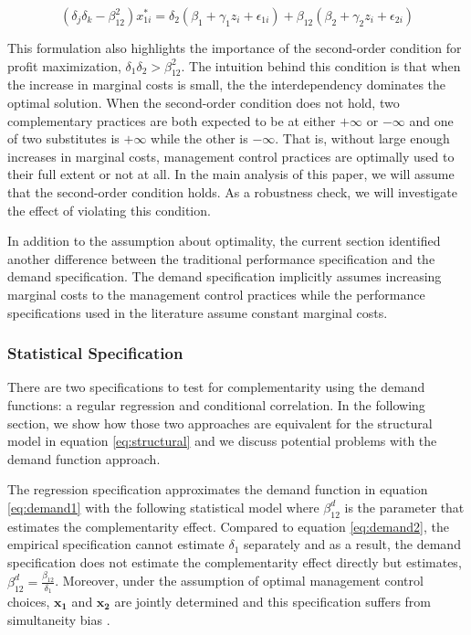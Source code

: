 \documentclass[12pt]{article}
\begin{document}
\begin{equation}\label{eq:demand2}
(\delta_j \delta_k - \beta_{12}^2) x^*_{1i}
    =  \delta_2 (\beta_1 + \gamma_1 z_i + \epsilon_{1i}) +
       \beta_{12} (\beta_2 + \gamma_2 z_i + \epsilon_{2i})
\end{equation}

This formulation also highlights the importance of the second-order
condition for profit maximization, \(\delta_1 \delta_2 > \beta_{12}^2\).
The intuition behind this condition is that when the increase in
marginal costs is small, the the interdependency dominates the optimal
solution. When the second-order condition does not hold, two
complementary practices are both expected to be at either \(+\infty\) or
\(-\infty\) and one of two substitutes is \(+\infty\) while the other is
\(-\infty\). That is, without large enough increases in marginal costs,
management control practices are optimally used to their full extent or
not at all. In the main analysis of this paper, we will assume that the
second-order condition holds. As a robustness check, we will investigate
the effect of violating this condition.

In addition to the assumption about optimality, the current section
identified another difference between the traditional performance
specification and the demand specification. The demand specification
implicitly assumes increasing marginal costs to the management control
practices while the performance specifications used in the literature
assume constant marginal costs.

\subsubsection{Statistical
Specification}\label{statistical-specification}

There are two specifications to test for complementarity using the
demand functions: a regular regression and conditional correlation. In
the following section, we show how those two approaches are equivalent
for the structural model in equation \eqref{eq:structural} and we
discuss potential problems with the demand function approach.

The regression specification approximates the demand function in
equation \eqref{eq:demand1} with the following statistical model where
\(\beta^d_{12}\) is the parameter that estimates the complementarity
effect. Compared to equation \eqref{eq:demand2}, the empirical
specification cannot estimate \(\delta_1\) separately and as a result,
the demand specification does not estimate the complementarity effect
directly but estimates, \(\beta^d_{12} = \frac{\beta_{12}}{\delta_1}\).
Moreover, under the assumption of optimal management control choices,
\(\mathbf{x_1}\) and \(\mathbf{x_2}\) are jointly determined and this
specification suffers from simultaneity bias \citep{Chenhall2007}.
\end{document}
